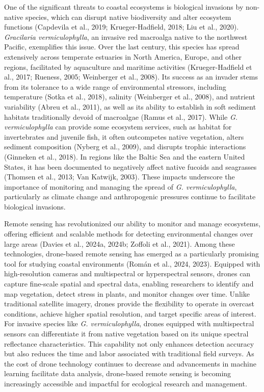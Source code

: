 \documentclass[
  letterpaper,
  DIV=11,
  numbers=noendperiod]{scrartcl}
\begin{document}
One of the significant threats to coastal ecosystems is biological
invasions by non-native species, which can disrupt native biodiversity
and alter ecosystem functions (Capdevila et al., 2019; Krueger-Hadfield,
2018; Liu et al., 2020). \emph{Gracilaria vermiculophylla}, an invasive
red macroalga native to the northwest Pacific, exemplifies this issue.
Over the last century, this species has spread extensively across
temperate estuaries in North America, Europe, and other regions,
facilitated by aquaculture and maritime activities (Krueger-Hadfield et
al., 2017; Rueness, 2005; Weinberger et al., 2008). Its success as an
invader stems from its tolerance to a wide range of environmental
stressors, including temperature (Sotka et al., 2018), salinity
(Weinberger et al., 2008), and nutrient variability (Abreu et al.,
2011), as well as its ability to establish in soft sediment habitats
traditionally devoid of macroalgae (Ramus et al., 2017). While \emph{G.
vermiculophylla} can provide some ecosystem services, such as habitat
for invertebrates and juvenile fish, it often outcompetes native
vegetation, alters sediment composition (Nyberg et al., 2009), and
disrupts trophic interactions (Ginneken et al., 2018). In regions like
the Baltic Sea and the eastern United States, it has been documented to
negatively affect native fucoids and seagrasses (Thomsen et al., 2013;
Van Katwijk, 2003). These impacts underscore the importance of
monitoring and managing the spread of \emph{G. vermiculophylla},
particularly as climate change and anthropogenic pressures continue to
facilitate biological invasions.

Remote sensing has revolutionized our ability to monitor and manage
ecosystems, offering efficient and scalable methods for detecting
environmental changes over large areas (Davies et al., 2024a, 2024b;
Zoffoli et al., 2021). Among these technologies, drone-based remote
sensing has emerged as a particularly promising tool for studying
coastal environments (Román et al., 2024, 2023). Equipped with
high-resolution cameras and multispectral or hyperspectral sensors,
drones can capture fine-scale spatial and spectral data, enabling
researchers to identify and map vegetation, detect stress in plants, and
monitor changes over time. Unlike traditional satellite imagery, drones
provide the flexibility to operate in overcast conditions, achieve
higher spatial resolution, and target specific areas of interest. For
invasive species like \emph{G. vermiculophylla}, drones equipped with
multispectral sensors can differentiate it from native vegetation based
on its unique spectral reflectance characteristics. This capability not
only enhances detection accuracy but also reduces the time and labor
associated with traditional field surveys. As the cost of drone
technology continues to decrease and advancements in machine learning
facilitate data analysis, drone-based remote sensing is becoming
increasingly accessible and impactful for ecological research and
management.
\end{document}
